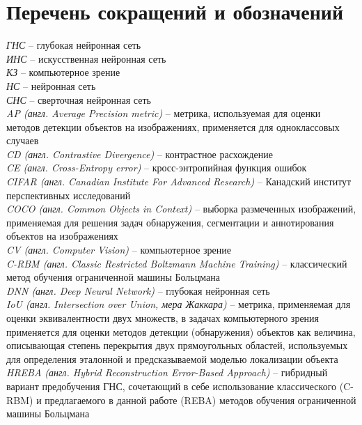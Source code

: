 \chapter*{Перечень сокращений и обозначений}

\noindent\textit{ГНС} -- глубокая нейронная сеть\\
\textit{ИНС} -- искусственная нейронная сеть\\
\textit{КЗ} -- компьютерное зрение\\
\textit{НС} -- нейронная сеть\\
\textit{СНС} -- сверточная нейронная сеть\\
\textit{AP (англ. Average Precision metric)} -- метрика, используемая для оценки методов детекции объектов на изображениях, применяется для одноклассовых случаев\\
\textit{CD (англ. Contrastive Divergence)} -- контрастное расхождение\\
\textit{CE (англ. Cross-Entropy error)} -- кросс-энтропийная функция ошибок\\
\textit{CIFAR (англ. Canadian Institute For Advanced Research)} -- Канадский институт перспективных исследований\\
\textit{COCO (англ. Common Objects in Context)} -- выборка размеченных изображений, применяемая для решения задач обнаружения, сегментации и аннотирования объектов на изображениях\\
\textit{CV (англ. Computer Vision)} -- компьютерное зрение\\
\textit{C-RBM (англ. Classic Restricted Boltzmann Machine Training)} -- классический метод обучения ограниченной машины Больцмана\\
\textit{DNN (англ. Deep Neural Network)} -- глубокая нейронная сеть\\
\textit{IoU (англ. Intersection over Union, мера Жаккара)} -- метрика, применяемая для оценки эквивалентности двух множеств, в задачах компьютерного зрения применяется для оценки методов детекции (обнаружения) объектов как величина, описывающая степень перекрытия двух прямоугольных областей, используемых для определения эталонной и предсказываемой моделью локализации объекта \\
\textit{HREBA (англ. Hybrid Reconstruction Error-Based Approach)} -- гибридный вариант предобучения ГНС, сочетающий в себе использование классического (C-RBM) и предлагаемого в данной работе (REBA) методов обучения ограниченной машины Больцмана\\
